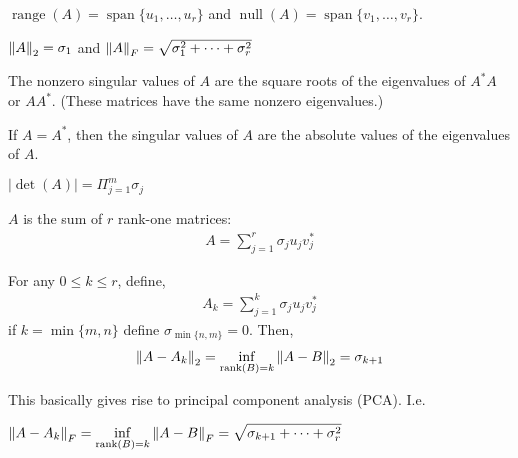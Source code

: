 \documentclass[12pt]{article}
\begin{document}
\begin{theorem}
\( \operatorname{range}(A) = \operatorname{span}\{u_1, \ldots, u_r\} \) and \( \operatorname{null}(A) = \operatorname{span}\{v_1, \ldots, v_r \} \).
\end{theorem}

\begin{theorem}
\( \left\lVert A\right\rVert_2 = \sigma_1 \) and \( \left\lVert A\right\rVert_F = \sqrt{\sigma_1^2 + \cdots + \sigma_r^2} \)
\end{theorem}

\begin{theorem}
    The nonzero singular values of \( A \) are the square roots of the eigenvalues of \( A^*A \) or \( AA^* \). (These matrices have the same nonzero eigenvalues.)
\end{theorem}

\begin{theorem}
If \( A = A^* \), then the singular values of \( A \) are the absolute values of the eigenvalues of \( A \).
\end{theorem}

\begin{theorem}
\( |\operatorname{det}(A)| = \Pi_{j=1}^{m} \sigma_j \)
\end{theorem}

\begin{theorem}
\( A \) is the sum of \( r \) rank-one matrices:
\begin{align*}
    A = \sum_{j=1}^{r} \sigma_j u_j v_j^*
\end{align*}
\end{theorem}

\begin{theorem}
For any \( 0\leq k\leq r \), define,
\begin{align*}
    A_k  = \sum_{j=1}^{k} \sigma_j u_j v_j^*
\end{align*}
if \( k = \min\{m,n\} \) define \( \sigma_{\min\{n,m\}} = 0 \). Then,
\begin{align*}
    \left\lVert A-A_k\right\rVert_2 = \inf_{\operatorname{rank}(B) = k}\left\lVert A-B\right\rVert_2 = \sigma_{k+1}
\end{align*}
\end{theorem}

This basically gives rise to principal component analysis (PCA). I.e.

\begin{theorem}
\( \displaystyle \left\lVert A-A_k\right\rVert_F = \inf_{\operatorname{rank}(B) = k}\left\lVert A-B\right\rVert_F = \sqrt{\sigma_{k+1} + \cdots + \sigma_r^2 } \)
\end{theorem}
\end{document}
